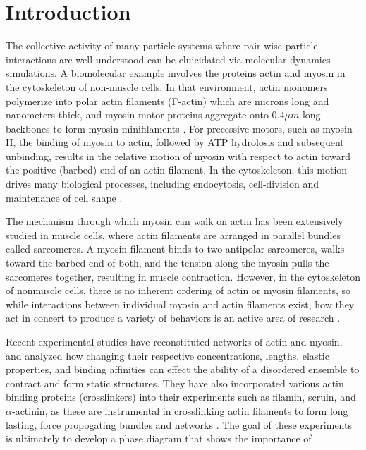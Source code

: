 \documentclass[12pt]{article}
\begin{document}
\section{Introduction} 
The collective activity of many-particle systems where pair-wise particle interactions are well understood 
can be eluicidated via molecular dynamics simulations. 
A biomolecular example involves the proteins actin and myosin in the cytoskeleton of non-muscle cells. In that
environment, actin monomers polymerize into polar actin filaments (F-actin) which are microns long and
nanometers thick, and myosin motor proteins aggregate onto $0.4\mu m$ long backbones to form myosin minifilaments \cite{niederman1975}. 
For precessive motors, such as myosin II, the binding of myosin to actin, followed by ATP hydrolosis and subsequent
unbinding, results in the relative motion of myosin with
respect to actin toward the positive (barbed) end of an actin filament. In the cytoskeleton, this
motion drives many biological processes, including endocytosis, cell-division and maintenance of cell shape
\cite{stricker2010, murrell2012}.
\par
The mechanism through which myosin can walk on actin has been extensively studied in muscle cells, where actin
filaments are arranged in parallel bundles called sarcomeres. A myosin filament binds to two antipolar
sarcomeres, walks toward the barbed end of both, and the tension along the myosin pulls the 
sarcomeres together, resulting in muscle contraction\cite{huxley1969}. 
However, in the cytoskeleton of nonmuscle cells, there is no inherent ordering of actin or myosin filaments, so while
interactions between individual myosin and actin filaments exist, how 
they act in concert to produce a variety of behaviors is an active area of research \cite{murrell2012, stam2015, murrell2015}. 
\par
Recent experimental studies \cite{murrell2012, murrell2014} have reconstituted networks of
actin and myosin, and analyzed how changing their respective concentrations, lengths, elastic properties, and binding affinities
can effect the ability of a disordered ensemble to contract and form static structures. They have also incorporated
various actin binding proteins (crosslinkers) into their experiments such as filamin, scruin, and $\alpha$-actinin, as these are
instrumental in crosslinking actin filaments to form long lasting, force propogating bundles and networks
\cite{gardel2004, murrell2012, murrell2014, murrell2015}. 
The goal of these experiments is ultimately to develop a phase diagram that shows the importance of 
\end{document}
